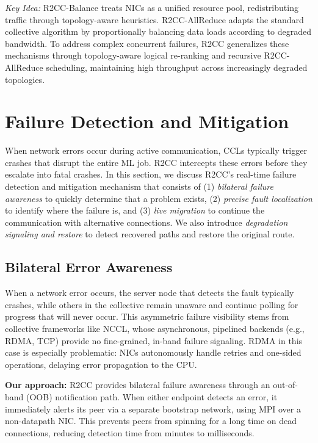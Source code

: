 \documentclass[letterpaper,twocolumn,10pt]{article}
\begin{document}
\textit{Key Idea:} R2CC-Balance treats NICs as a unified resource pool, redistributing traffic through topology-aware heuristics. R2CC-AllReduce adapts the standard collective algorithm by proportionally balancing data loads according to degraded bandwidth. To address complex concurrent failures, R2CC generalizes these mechanisms through topology-aware logical re-ranking and recursive R2CC-AllReduce scheduling, maintaining high throughput across increasingly degraded topologies.




\section{Failure Detection and Mitigation}\label{sec:design-mig}

When network errors occur during active communication, CCLs typically trigger crashes that disrupt the entire ML job. R2CC intercepts these errors before they escalate into fatal crashes. In this section, we discuss R2CC's real-time failure detection and mitigation mechanism that consists of
(1) \textit{bilateral failure awareness} to quickly determine that a problem exists, (2) \textit{precise fault localization} to identify where the failure is, and (3) \textit{live migration} to continue the communication with alternative connections. We also introduce \textit{degradation signaling and restore} to detect recovered paths and restore the original route.

\subsection{Bilateral Error Awareness}

When a network error occurs, the server node that detects the fault typically crashes, while others in the collective remain unaware and continue polling for progress that will never occur. This asymmetric failure visibility stems from collective frameworks like NCCL, whose asynchronous, pipelined backends (e.g., RDMA, TCP) provide no fine-grained, in-band failure signaling. RDMA in this case is especially problematic: NICs autonomously handle retries and one-sided operations, delaying error propagation to the CPU.

\smallskip\textbf{Our approach:} R2CC provides bilateral failure awareness through an out-of-band (OOB) notification path. When either endpoint detects an error, it immediately alerts its peer via a separate bootstrap network, using MPI over a non-datapath NIC. This prevents peers from spinning for a long time on dead connections, reducing detection time from minutes to milliseconds.
\end{document}
